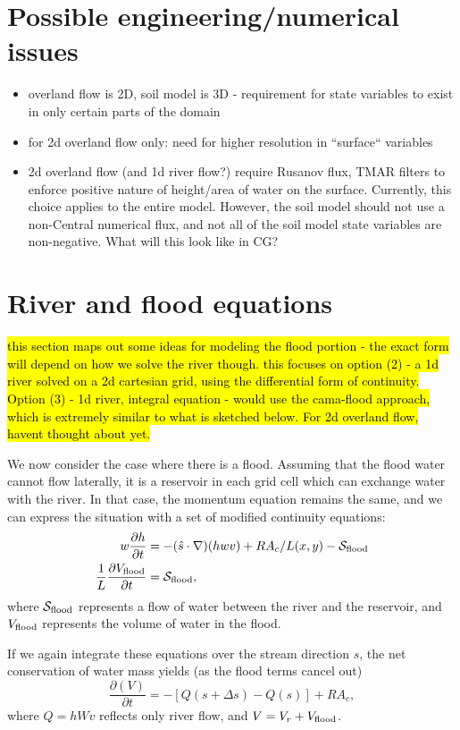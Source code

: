 \documentclass[twoside,10pt]{report}
\begin{document}
\section{Possible engineering/numerical issues}
\begin{itemize}
    \item overland flow is 2D, soil model is 3D - requirement for state variables to exist in only certain parts of the domain
    \item for 2d overland flow only: need for higher resolution in ``surface`` variables
    \item 2d overland flow (and 1d river flow?) require Rusanov flux, TMAR filters to enforce positive nature of height/area of water on the surface. Currently, this choice applies to the entire model. However, the soil model should not use a non-Central numerical flux, and not all of the soil model state variables are non-negative. What will this look like in CG?
\end{itemize}
\section{River and flood equations}
\hl{this section maps out some ideas for modeling the flood portion - the exact form will depend on how we solve the river though. this focuses on option (2) - a 1d river solved on a 2d cartesian grid, using the differential form of continuity. Option (3) - 1d river, integral equation -  would use the cama-flood approach, which is extremely similar to what is sketched below. For 2d overland flow, havent thought about yet.}

We now consider the case where there is a flood. Assuming that the flood water cannot flow laterally, it is a reservoir in each grid cell which can exchange water with the river. In that case, the momentum equation remains the same, and we can express the situation with a set of modified continuity equations:
\begin{align}
    w\frac{\partial h}{\partial t} &= -(\hat{s} \cdot \nabla) (hwv) +  R A_c/L(x,y) - \mathcal{S}_{\rm flood} \nonumber \\
    \frac{1}{L}\frac{\partial V_{\rm flood}}{\partial t} & = \mathcal{S}_{\rm flood},
\end{align}
where $\mathcal{S}_{\rm flood}$ represents a flow of water between the river and the reservoir, and $V_{\rm flood}$ represents the volume of water in the flood. 



If we again integrate these equations over the stream direction $s$, the net conservation of water mass yields (as the flood terms cancel out)
\begin{equation}
    \frac{\partial (V)}{\partial t} = -[Q(s+\Delta s) - Q(s)]   +  R A_c,
\end{equation}
where $Q = hWv$ reflects only river flow, and $V = V_r + V_{\rm flood}$.
\end{document}
